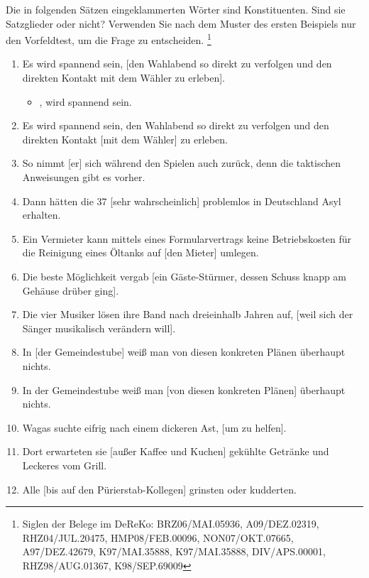  \label{exc:konstituentenstruktur02} Die in folgenden Sätzen eingeklammerten Wörter sind Konstituenten.
Sind sie Satzglieder oder nicht?
Verwenden Sie nach dem Muster des ersten Beispiels nur den Vorfeldtest, um die Frage zu entscheiden.%
\footnote{Siglen der Belege im DeReKo: BRZ06\slash MAI.05936, A09\slash DEZ.02319, RHZ04\slash JUL.20475, HMP08\slash FEB.00096, NON07\slash OKT.07665, A97\slash DEZ.42679, K97\slash MAI.35888, K97\slash MAI.35888, DIV\slash APS.00001, RHZ98\slash AUG.01367, K98\slash SEP.69009}

\begin{enumerate}
  \item Es wird spannend sein, [den Wahlabend so direkt zu verfolgen und den direkten Kontakt mit dem Wähler zu erleben].
    \begin{itemize}
      \item {}, wird spannend sein.
    \end{itemize}
  \item Es wird spannend sein, den Wahlabend so direkt zu verfolgen und den direkten Kontakt [mit dem Wähler] zu erleben.
  \item So nimmt [er] sich während den Spielen auch zurück, denn die taktischen Anweisungen gibt es vorher.
  \item Dann hätten die 37 [sehr wahrscheinlich] problemlos in Deutschland Asyl erhalten.
  \item Ein Vermieter kann mittels eines Formularvertrags keine Betriebskosten für die Reinigung eines Öltanks auf [den Mieter] umlegen.
  \item Die beste Möglichkeit vergab [ein Gäste-Stürmer, dessen Schuss knapp am Gehäuse drüber ging].
  \item Die vier Musiker lösen ihre Band nach dreieinhalb Jahren auf, [weil sich der Sänger musikalisch verändern will].
  \item In [der Gemeindestube] weiß man von diesen konkreten Plänen überhaupt nichts.
  \item In der Gemeindestube weiß man [von diesen konkreten Plänen] überhaupt nichts.
  \item Wagas suchte eifrig nach einem dickeren Ast, [um zu helfen].
  \item Dort erwarteten sie [außer Kaffee und Kuchen] gekühlte Getränke und Leckeres vom Grill.
  \item Alle [bis auf den Pürierstab-Kollegen] grinsten oder kudderten.
\end{enumerate}

